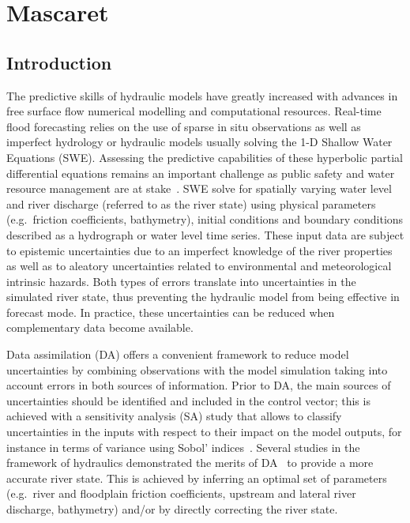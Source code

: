 \chapter{Mascaret}

\section{Introduction}

The predictive skills of hydraulic models have greatly increased with advances in free surface flow numerical modelling and computational resources. Real-time flood forecasting relies on the use of sparse in situ observations as well as imperfect hydrology or hydraulic models usually solving the 1-D Shallow Water Equations (SWE). Assessing the predictive capabilities of these hyperbolic partial differential equations remains an important challenge as public safety and water resource management are at stake~\citep{weerts2011}. SWE solve for spatially varying water level and river discharge (referred to as the river state) using physical parameters (e.g.~friction coefficients, bathymetry), initial conditions and boundary conditions described as a hydrograph or water level time series. These input data are subject to epistemic uncertainties due to an imperfect knowledge of the river properties as well as to aleatory uncertainties related to environmental and meteorological intrinsic hazards. Both types of errors translate into uncertainties in the simulated river state, thus preventing the hydraulic model from being effective in forecast mode. In practice, these uncertainties can be reduced when complementary data become available.

Data assimilation (DA) offers a convenient framework to reduce model uncertainties by combining observations with the model simulation taking into account errors in both sources of information. Prior to DA, the main sources of uncertainties should be identified and included in the control vector; this is achieved with a sensitivity analysis (SA) study that allows to classify uncertainties in the inputs with respect to their impact on the model outputs, for instance in terms of variance using Sobol' indices~\citep{iooss2016,DeLozzo2017}. Several studies in the framework of hydraulics demonstrated the merits of DA~\citep{barthelemy2015,cloke2009,dechant2011,habert2016,moradkhani2005} to provide a more accurate river state.
This is achieved by inferring an optimal set of parameters (e.g.~river and floodplain friction coefficients, upstream and lateral river discharge, bathymetry) and/or by directly correcting the river state.

